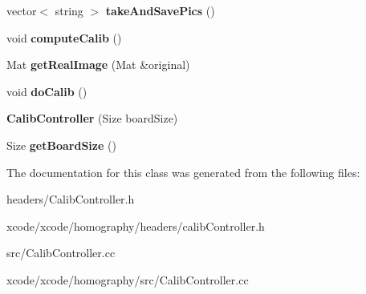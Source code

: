 \begin{DoxyCompactItemize}
\item 
\hypertarget{class_calib_controller_a98f63965152d1f337c55bd1584eb4cb3}{vector$<$ string $>$ {\bfseries take\-And\-Save\-Pics} ()}\label{class_calib_controller_a98f63965152d1f337c55bd1584eb4cb3}

\item 
\hypertarget{class_calib_controller_a1e4505d8fd2f7ce275fec12a10e1c591}{void {\bfseries compute\-Calib} ()}\label{class_calib_controller_a1e4505d8fd2f7ce275fec12a10e1c591}

\item 
\hypertarget{class_calib_controller_a01093e8a1e478e536dafdba833b24d57}{Mat {\bfseries get\-Real\-Image} (Mat \&original)}\label{class_calib_controller_a01093e8a1e478e536dafdba833b24d57}

\item 
\hypertarget{class_calib_controller_ab5118d61dbbb24ca2b88713f56666540}{void {\bfseries do\-Calib} ()}\label{class_calib_controller_ab5118d61dbbb24ca2b88713f56666540}

\item 
\hypertarget{class_calib_controller_a927ad2def953ee2f7f7e6819d73352d7}{{\bfseries Calib\-Controller} (Size board\-Size)}\label{class_calib_controller_a927ad2def953ee2f7f7e6819d73352d7}

\item 
\hypertarget{class_calib_controller_ad5f91606cb01ac9ee3da9c8dfc90495c}{Size {\bfseries get\-Board\-Size} ()}\label{class_calib_controller_ad5f91606cb01ac9ee3da9c8dfc90495c}

\end{DoxyCompactItemize}


The documentation for this class was generated from the following files\-:\begin{DoxyCompactItemize}
\item 
headers/Calib\-Controller.\-h\item 
xcode/xcode/homography/headers/calib\-Controller.\-h\item 
src/Calib\-Controller.\-cc\item 
xcode/xcode/homography/src/Calib\-Controller.\-cc\end{DoxyCompactItemize}
